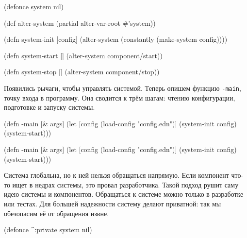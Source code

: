 \else

\begin{english}
  \begin{clojure}
(defonce system nil)

(def alter-system (partial alter-var-root #'system))

(defn system-init [config]
  (alter-system (constantly (make-system config))))

(defn system-start []
  (alter-system component/start))

(defn system-stop []
  (alter-system component/stop))
  \end{clojure}
\end{english}

\fi


Появились рычаги, чтобы управлять системой. Теперь опишем функцию \verb|-main|,
точку входа в программу. Она сводится к трём шагам: чтению конфигурации,
подготовке и запуску системы.

\ifnarrow

\begin{english}
  \begin{clojure}
(defn -main [& args]
  (let [config
        (load-config "config.edn")]
    (system-init config)
    (system-start)))
  \end{clojure}
\end{english}

\else

\begin{english}
  \begin{clojure}
(defn -main [& args]
  (let [config (load-config "config.edn")]
    (system-init config)
    (system-start)))
  \end{clojure}
\end{english}

\fi

Система глобальна, но к ней нельзя обращаться напрямую. Если компонент что-то
ищет в недрах системы, это провал разработчика. Такой подход рушит саму идею
системы и компонентов. Обращаться к системе можно только в разработке или
тестах. Для большей надежности систему делают приватной: так мы обезопасим её от
обращения извне.


\begin{english}
  \begin{clojure}
(defonce ^:private system nil)
  \end{clojure}
\end{english}

